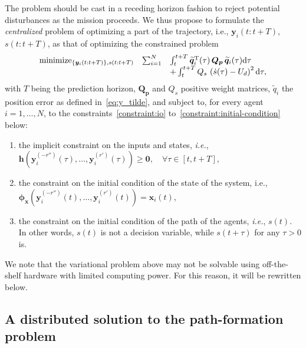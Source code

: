 The problem should be cast in a receding horizon fashion to reject potential disturbances as the mission proceeds.     
We thus propose to formulate the \emph{centralized} problem of optimizing a part of the trajectory, i.e., $\bm{y}_i(t:t+T)$, \linebreak $s(t:t+T)$, as that of optimizing the constrained problem
%
\begin{equation}
    \begin{array}{rcl}
        \operatorname*{\mathrm{minimize}}_{ \left\lbrace \bm{y}_i(t:t+T) \right\rbrace, s(t:t+T)}
        &
        \sum_{i=1}^N
        &
        \int_{t}^{t+T}
        \widetilde{\bm{q}}_i^{\mathrm{T}}(\tau) \, \bm{Q}_{\bm{p}} \, \widetilde{\bm{q}}_i(\tau) {\rm d}\tau \\
        &
        & 
        +
        \int_{t}^{t+T} Q_s\,\left(\dot{s}(\tau) - U_d\right)^2 {\rm d}\tau, 
    \end{array}
\label{eq:optimization_centralized}
\end{equation}
with $T$ being the prediction horizon, $\bm{Q}_{\bm{p}}$ and $Q_s$ positive weight matrices, $\widetilde{q}_{i}$ the position error as defined in~\eqref{eq:y_tilde}, and subject to, for every agent $i = 1, \ldots, N$, to the constraints~\ref{constraint:io} to~\ref{constraint:initial-condition} below:
\begin{enumerate}[label=C\arabic*]
    \item the implicit constraint on the inputs and states, \emph{i.e.}, $\bm{h} \left( \bm{y}_i^{(-r'')}(\tau), \ldots, \bm{y}^{(r')}_i(\tau) \right) \geq \bm{0}, \quad \forall \tau \in [t, t + T]$,
    \label{constraint:io}
    \item the constraint on the initial condition of the state of the system, i.e., $\bm{\phi}_{\bm{x}} \left(\bm{y}_i^{(-r'')}(t), \ldots, \bm{y}^{(r')}_i(t)\right) = \bm{x}_{i}(t)$,
    \item the constraint on the initial condition of the path of the agents, \emph{i.e.}, $s(t)$. In other words, $s(t)$ is not a decision variable, while $s(t+\tau)$ for any $\tau > 0$ is.
    \label{constraint:initial-condition}
\end{enumerate}
We note that the variational problem above may not be solvable using off-the-shelf hardware with limited computing power. For this reason, it will be rewritten below.



\subsection{A distributed solution to the path-formation problem}



